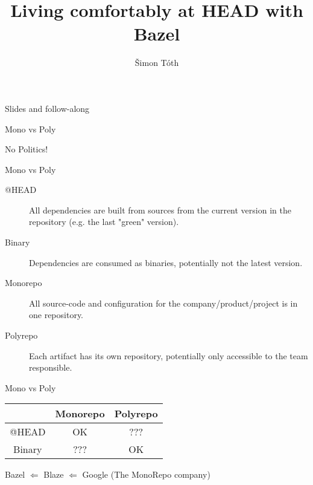 \documentclass[aspectratio=169]{beamer}
\title{Living comfortably at HEAD with Bazel}
\author{Šimon Tóth}
\begin{document}
\begin{frame}{}
    \titlepage
\end{frame}

\begin{frame}{Slides and follow-along}
\begin{center}

\end{center}
\end{frame}



\begin{frame}{Mono vs Poly}
\begin{center}
\begin{Huge}
No Politics!
\end{Huge}
\end{center}
\end{frame}

\begin{frame}{Mono vs Poly}
\begin{description}
    \item[@HEAD]{All dependencies are built from sources from the current version in the repository (e.g. the last "green" version).}
    \item[Binary]{Dependencies are consumed as binaries, potentially not the latest version.}
    \item[Monorepo]{All source-code and configuration for the company/product/project is in one repository.}
    \item[Polyrepo]{Each artifact has its own repository, potentially only accessible to the team responsible.}
\end{description}
\end{frame}

\begin{frame}{Mono vs Poly}
\begin{center}
\begin{Huge}
    \begin{tabular}{c|c|c}
                &   Monorepo    &   Polyrepo \\\hline 
        @HEAD   & OK & ??? \\ 
        Binary  & ??? & OK \\
    \end{tabular}
\end{Huge}
\end{center}
\end{frame}


\begin{frame}{}
Bazel \pause $\Leftarrow$ Blaze \pause $\Leftarrow$ Google (The MonoRepo company)
\end{frame}
\end{document}
